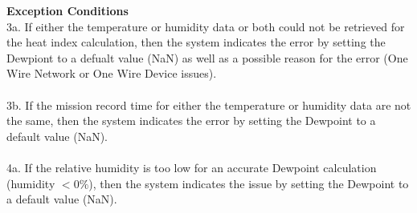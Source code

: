 \documentclass[letterpaper]{article}
\begin{document}
\textbf{Exception Conditions}\\
3a.  If either the temperature or humidity data or both could not
be retrieved for the heat index calculation, then the system
indicates the error by setting the Dewpiont to a defualt value
(NaN) as well as a possible reason for the error (One Wire Network
or One Wire Device issues).\\\\
3b.  If the mission record time for either the temperature or
humidity data are not the same, then the system indicates the
error by setting the Dewpoint to a default value (NaN).\\\\
4a.  If the relative humidity is too low for an accurate Dewpoint
calculation (humidity $< 0\%$), then the system indicates the issue
by setting the Dewpoint to a default value (NaN).
\end{document}
